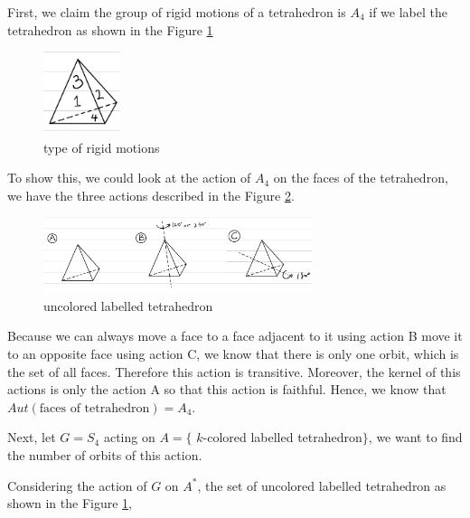 \begin{answer}
    First, we claim the group of rigid motions of a tetrahedron is $A_4$ if we label the tetrahedron as shown in the Figure \ref{fig:fig3}
    \begin{figure}[H]
        \centering
        \includegraphics[width=0.2\textwidth]{Figure 3.jpg}
        \caption{\label{fig:fig3}type of rigid motions}
    \end{figure}
    To show this, we could look at the action of $A_4$ on the faces of the tetrahedron, we have the three actions described in the Figure \ref{fig:fig4}.
    \begin{figure}[H]
        \centering
        \includegraphics[width=0.7\textwidth]{Figure 4.jpg}
        \caption{\label{fig:fig4}uncolored labelled tetrahedron}
    \end{figure}
    Because we can always move a face to a face adjacent to it using action B move it to an opposite face using action C, we know that there is only one orbit, which is the set of all faces. Therefore this action is transitive. Moreover, the kernel of this actions is only the action A so that this action is faithful. Hence, we know that $Aut(\text{faces of tetrahedron}) = A_4$.
    
    Next, let $G = S_4$ acting on $A=\{$ $k$-colored labelled tetrahedron$\}$, we want to find the number of orbits of this action.
    
    Considering the action of $G$ on $A^*$, the set of uncolored labelled tetrahedron as shown in the Figure \ref{fig:fig3}, 
    

\end{answer}
